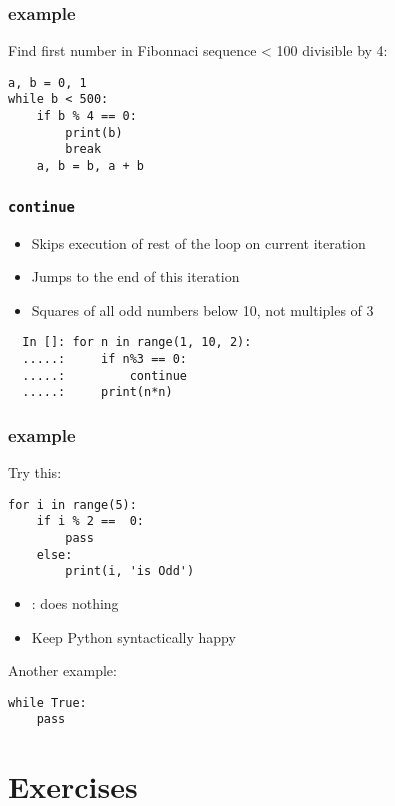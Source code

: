 \documentclass[14pt,compress]{beamer}
\begin{document}
\begin{frame}[fragile]
  \frametitle{ example}
  Find first number in Fibonnaci sequence < 100 divisible by 4:
\begin{lstlisting}
a, b = 0, 1
while b < 500:
    if b % 4 == 0:
        print(b)
        break
    a, b = b, a + b

\end{lstlisting}
\end{frame}

\begin{frame}[fragile]
  \frametitle{\texttt{continue}}
  \begin{itemize}
  \item Skips execution of rest of the loop on current iteration
  \item Jumps to the end of this iteration
  \item Squares of all odd numbers below 10, not multiples of 3
  \end{itemize}
  \begin{lstlisting}
  In []: for n in range(1, 10, 2):
  .....:     if n%3 == 0:
  .....:         continue
  .....:     print(n*n)
  \end{lstlisting}
\end{frame}


\begin{frame}[fragile]
  \frametitle{ example}
Try this:
\begin{lstlisting}
for i in range(5):
    if i % 2 ==  0:
        pass
    else:
        print(i, 'is Odd')
\end{lstlisting}
\begin{itemize}
\item {}: does nothing
\item Keep Python syntactically happy
\end{itemize}
Another example:
\begin{lstlisting}
while True:
    pass
\end{lstlisting}
\end{frame}



\section{Exercises}
\end{document}
